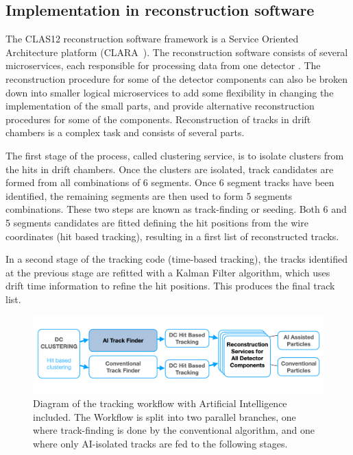\subsection{Implementation in reconstruction software}

The CLAS12 reconstruction software framework is a Service Oriented Architecture platform (CLARA~\cite{Gyurjyan:2011zz}).
The reconstruction software consists of several microservices, each responsible for processing data from one
detector \cite{Ziegler:2020gsr}. The reconstruction procedure for some of the detector components can also 
be broken down into smaller logical microservices to add some flexibility in changing the implementation of 
the small parts, and provide alternative reconstruction procedures for some of the components. Reconstruction 
of tracks in drift chambers is a complex task and consists of several parts.

The first stage of the process, called clustering service, is to isolate clusters from the hits in drift chambers. 
Once the clusters are isolated, track candidates are formed from all combinations of 6 segments. Once 6 
segment tracks have been identified, the remaining segments are then used to form 5 segments combinations. 
These two steps are known as track-finding or seeding. Both 6 and 5 segments candidates are fitted defining 
the hit positions from the wire coordinates (hit based tracking), resulting in a first list of reconstructed tracks.

In a second stage of the tracking code (time-based tracking), the tracks identified at the previous stage are 
refitted with a Kalman Filter algorithm, which uses drift time information to refine the hit positions. This 
produces the final track list.

\begin{figure}[!ht]
\begin{center}
 \includegraphics[width=6.0in]{images/CLARA_AI_diagram.png}
\caption {Diagram of the tracking workflow with Artificial Intelligence included. The Workflow is split into 
two parallel branches, one where track-finding is done by the conventional algorithm, and one where only 
AI-isolated tracks are fed to the following stages.}
 \label{recon:diagram}
 \end{center}
\end{figure}

